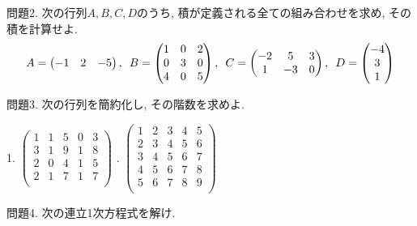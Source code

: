 \documentclass[dvipdfmx,a4paper,11pt]{article}
\theoremstyle{definition}
\begin{document}
\vspace{5pt}
 問題2. 次の行列$A,B,C,D$のうち, 積が定義される全ての組み合わせを求め, その積を計算せよ.
 $$
  A=\begin{pmatrix} %
 -1 & 2 &-5  \\
 \end{pmatrix} 
 \text{, \,\,} 
B= \begin{pmatrix} %
 1& 0 & 2\\
 0 & 3 & 0\\
 4 & 0 & 5 \\
 \end{pmatrix} %
 \text{, \,\,} 
 C=
  \begin{pmatrix}
 -2 &5 & 3\\
1 &-3&0  \\
 \end{pmatrix}
 \text{, \,\,} 
 D= \begin{pmatrix} %
 -4\\
 3 \\
 1
 \end{pmatrix}
 $$
 
 \vspace{5pt}
 問題3.  次の行列を簡約化し, その階数を求めよ.

1.
   \setlength{\parskip}{0cm} %
  \setlength{\itemsep}{0cm} %
$
 \begin{pmatrix}
 1& 1& 5  & 0&3\\
 3& 1& 9  & 1&8\\
 2& 0& 4 & 1&5\\
 2& 1& 7 & 1&7\\
 \end{pmatrix}
 $
   . $
 \begin{pmatrix}
 1& 2& 3  & 4&5\\
 2& 3& 4  & 5&6\\
 3& 4& 5 & 6&7\\
 4& 5& 6 & 7&8\\
 5& 6& 7 & 8&9\\
 \end{pmatrix}
 $
    

 
 問題4. 次の連立1次方程式を解け. 
 
\end{document}

